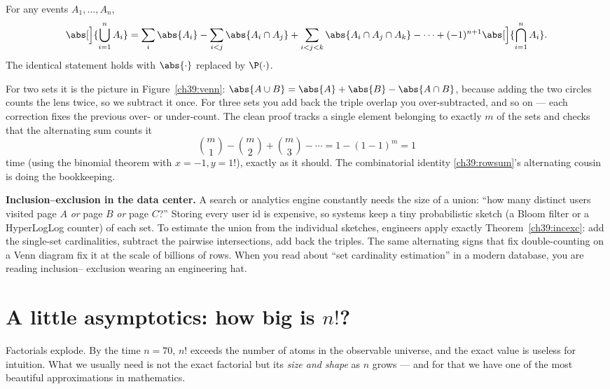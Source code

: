 \begin{theorem}
\label{ch39:incexc}
For any events $A_1,\dots,A_n$,
\[
  \abs[\Big]{\bigcup_{i=1}^n A_i}
  = \sum_i \abs{A_i} - \sum_{i<j}\abs{A_i \cap A_j}
  + \sum_{i<j<k}\abs{A_i \cap A_j \cap A_k} - \cdots
  + (-1)^{n+1}\abs[\Big]{\bigcap_{i=1}^n A_i}.
\]
The identical statement holds with $\abs{\cdot}$ replaced by $\P(\cdot)$.
\end{theorem}

\begin{whybox}
For two sets it is the picture in Figure~\ref{ch39:venn}: $\abs{A \cup B} =
\abs{A} + \abs{B} - \abs{A \cap B}$, because adding the two circles counts the
lens twice, so we subtract it once. For three sets you add back the triple
overlap you over-subtracted, and so on --- each correction fixes the previous
over- or under-count. The clean proof tracks a single element belonging to
exactly $m$ of the sets and checks that the alternating sum counts it
\[
  \binom{m}{1} - \binom{m}{2} + \binom{m}{3} - \cdots = 1 - (1-1)^m = 1
\]
time (using the binomial theorem with $x=-1,y=1$!), exactly as it should. The
combinatorial identity \eqref{ch39:rowsum}'s alternating cousin is doing the
bookkeeping.
\end{whybox}

\begin{applicationbox}
\textbf{Inclusion--exclusion in the data center.} A search or analytics engine
constantly needs the size of a union: ``how many distinct users visited page
$A$ \emph{or} page $B$ \emph{or} page $C$?'' Storing every user id is
expensive, so systems keep a tiny probabilistic sketch (a Bloom filter or a
HyperLogLog counter) of each set. To estimate the union from the individual
sketches, engineers apply exactly Theorem~\ref{ch39:incexc}: add the
single-set cardinalities, subtract the pairwise intersections, add back the
triples. The same alternating signs that fix double-counting on a Venn diagram
fix it at the scale of billions of rows. When you read about ``set
cardinality estimation'' in a modern database, you are reading inclusion--
exclusion wearing an engineering hat.
\end{applicationbox}

\section{A little asymptotics: how big is $n!$?}
\label{ch39:asymptotics}

Factorials explode. By the time $n = 70$, $n!$ exceeds the number of atoms in
the observable universe, and the exact value is useless for intuition. What we
usually need is not the exact factorial but its \emph{size and shape} as $n$
grows --- and for that we have one of the most beautiful approximations in
mathematics.

